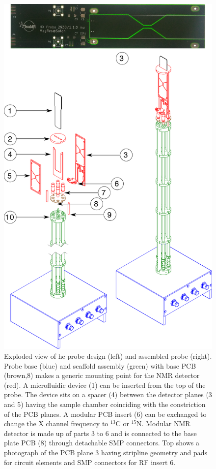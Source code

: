 \documentclass[preprint,12pt]{article}
\begin{document}
\begin{figure}
\centering
\includegraphics[width=\linewidth,keepaspectratio=true]{./figures/ms5n17-tlp-im-181015-probe-explode.png} 
\caption{Exploded view of he probe design (left) and assembled probe (right). Probe base (blue) and scaffold assembly (green) with base PCB (brown,8) makes a generic mounting point for the NMR detector (red). A microfluidic device (1) can be inserted from the top of the probe. The device sits on a spacer (4) between the detector planes (3 and 5) having the sample chamber coinciding with the constriction of the PCB planes. A modular PCB insert (6) can be exchanged to change the X channel frequency to $^{13}$C or $^{15}$N. Modular NMR detector is made up of parts 3 to 6 and is connected to the base plate PCB (8) through detachable SMP connectors. Top shows a photograph of the PCB plane 3 having stripline geometry and pads for circuit elements and SMP connectors for RF insert 6. }
\label{fig:probe-explode} 
\end{figure}
\end{document}
